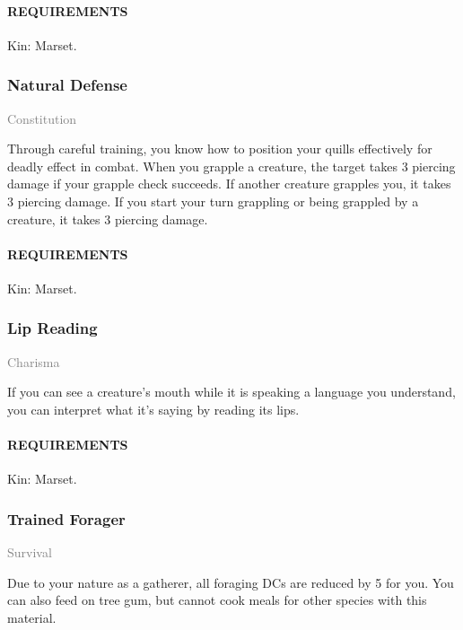     \paragraph{REQUIREMENTS} Kin: Marset.

    \subsubsection{Natural Defense} \label{feat::naturaldefense}
    \small{\textcolor{gray}{Constitution}}

    \normalsize
    Through careful training, you know how to position your quills effectively for deadly effect in combat.
    When you grapple a creature, the target takes 3 piercing damage if your grapple check succeeds.
    If another creature grapples you, it takes 3 piercing damage.
    If you start your turn grappling or being grappled by a creature, it takes 3 piercing damage.
    \paragraph{REQUIREMENTS} Kin: Marset.

    \subsubsection{Lip Reading} \label{feat::lipreading}
    \small{\textcolor{gray}{Charisma}}

    \normalsize
    If you can see a creature's mouth while it is speaking a language you understand, you can interpret what it's saying by reading its lips.
    \paragraph{REQUIREMENTS} Kin: Marset.

    \subsubsection{Trained Forager} \label{feat::trainedforager}
    \small{\textcolor{gray}{Survival}}

    \normalsize
    Due to your nature as a gatherer, all foraging DCs are reduced by 5 for you.
    You can also feed on tree gum, but cannot cook meals for other species with this material.
